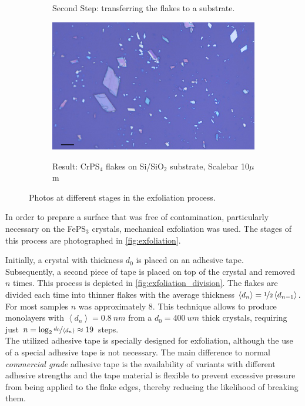 \documentclass[
	oneside,
	parskip=half,
	a4paper,
]{scrbook}
\begin{document}
\begin{figure}[h]
\begin{subfigure}[t]{.3\textwidth}
		\caption{Second Step: transferring the flakes to a substrate.}
		\label{fig:exfoliation_transfer}
	\end{subfigure}
	\begin{subfigure}[t]{.3\textwidth}
		\vskip 0pt
		\includegraphics[width=\textwidth]{../../data/2023-12-04_LO_MG_NiPS3/CrPS4_50x_10um.png}\\
		\caption{Result: CrPS$_\text{4}$ flakes on Si/SiO$_\text{2}$ substrate, Scalebar 10$\mu$m}
		\label{fig:exfoliation_result}
	\end{subfigure}
	\caption{Photos at different stages in the exfoliation process.}
	\label{fig:exfoliation}
\end{figure}
In order to prepare a surface that was free of contamination, particularly necessary on the FePS$_3$ crystals, mechanical exfoliation was used.
The stages of this process are photographed in \autoref{fig:exfoliation}.

Initially, a crystal with thickness $d_0$ is placed on an adhesive tape.\\
Subsequently, a second piece of tape is placed on top of the crystal and removed $n$ times.
This process is depicted in \autoref{fig:exfoliation_division}.
The flakes are divided each time into thinner flakes with the average thickness $\left< d_{n} \right> = \nicefrac{1}{2} \left< d_{n-1} \right>$.\\
For most samples $n$ was approximately $8$.
This technique allows to produce monolayers with $ \left<d_n\right>  = \SI{0.8}{nm}$ \cite{NiPS3_few_layer} from a $d_0 = \SI{400}{um}$ thick crystals, requiring just $n = \log_2 \nicefrac{d_0}{\left<d_n\right>} \approx 19$ steps.\\
The utilized adhesive tape is specially designed for exfoliation, although the use of a special adhesive tape is not necessary.
The main difference to normal \textit{commercial grade} adhesive tape is the availability of variants with different adhesive strengths 
and the tape material is flexible to prevent excessive pressure from being applied to the flake edges, thereby reducing the likelihood of breaking them.
\end{document}
